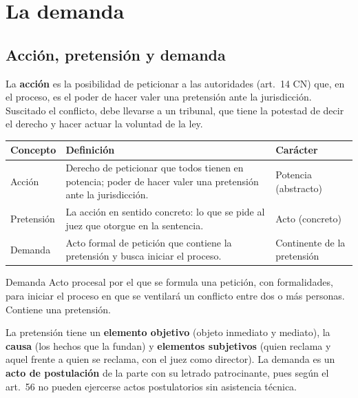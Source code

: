 \documentclass[12pt,oneside]{book}
\renewcommand{\arraystretch}{1.15}
\begin{document}
\chapter{La demanda}
\label{cap:demanda}

\section{Acción, pretensión y demanda}

La \textbf{acción} es la posibilidad de peticionar a las autoridades (art.~14 CN) que, en el proceso, es el poder de hacer valer una pretensión ante la jurisdicción. Suscitado el conflicto, debe llevarse a un tribunal, que tiene la potestad de decir el derecho y hacer actuar la voluntad de la ley.

\begin{table}[H]
\centering
\renewcommand{\arraystretch}{1.25}
\begin{tabularx}{\textwidth}{>{\RaggedRight\arraybackslash}p{}>{\RaggedRight\arraybackslash}X>{\RaggedRight\arraybackslash}p{}}
\toprule
\textbf{Concepto} & \textbf{Definición} & \textbf{Carácter} \\
\midrule
Acción & Derecho de peticionar que todos tienen en potencia; poder de hacer valer una pretensión ante la jurisdicción. & Potencia (abstracto) \\
Pretensión & La acción en sentido concreto: lo que se pide al juez que otorgue en la sentencia. & Acto (concreto) \\
Demanda & Acto formal de petición que contiene la pretensión y busca iniciar el proceso. & Continente de la pretensión \\
\bottomrule
\end{tabularx}
\end{table}

\begin{definition}{Demanda}
Acto procesal por el que se formula una petición, con formalidades, para iniciar el proceso en que se ventilará un conflicto entre dos o más personas. Contiene una pretensión.
\end{definition}

La pretensión tiene un \textbf{elemento objetivo} (objeto inmediato y mediato), la \textbf{causa} (los hechos que la fundan) y \textbf{elementos subjetivos} (quien reclama y aquel frente a quien se reclama, con el juez como director). La demanda es un \textbf{acto de postulación} de la parte con su letrado patrocinante, pues según el art.~56 no pueden ejercerse actos postulatorios sin asistencia técnica.
\end{document}
